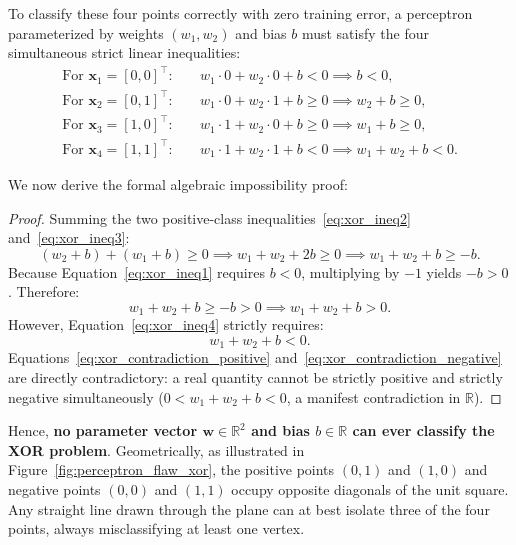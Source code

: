 To classify these four points correctly with zero training error, a perceptron parameterized by weights $(w_1, w_2)$ and bias $b$ must satisfy the four simultaneous strict linear inequalities:
\begin{align}
\text{For } \mathbf{x}_1 = [0, 0]^\top: \quad & w_1 \cdot 0 + w_2 \cdot 0 + b < 0 \implies b < 0, \label{eq:xor_ineq1} \\
\text{For } \mathbf{x}_2 = [0, 1]^\top: \quad & w_1 \cdot 0 + w_2 \cdot 1 + b \ge 0 \implies w_2 + b \ge 0, \label{eq:xor_ineq2} \\
\text{For } \mathbf{x}_3 = [1, 0]^\top: \quad & w_1 \cdot 1 + w_2 \cdot 0 + b \ge 0 \implies w_1 + b \ge 0, \label{eq:xor_ineq3} \\
\text{For } \mathbf{x}_4 = [1, 1]^\top: \quad & w_1 \cdot 1 + w_2 \cdot 1 + b < 0 \implies w_1 + w_2 + b < 0. \label{eq:xor_ineq4}
\end{align}

We now derive the formal algebraic impossibility proof:
\begin{proof}
Summing the two positive-class inequalities~\eqref{eq:xor_ineq2} and~\eqref{eq:xor_ineq3}:
\begin{equation}
(w_2 + b) + (w_1 + b) \ge 0 \implies w_1 + w_2 + 2b \ge 0 \implies w_1 + w_2 + b \ge -b.
\end{equation}
Because Equation~\eqref{eq:xor_ineq1} requires $b < 0$, multiplying by $-1$ yields $-b > 0$. Therefore:
\begin{equation}
w_1 + w_2 + b \ge -b > 0 \implies w_1 + w_2 + b > 0.
\label{eq:xor_contradiction_positive}
\end{equation}
However, Equation~\eqref{eq:xor_ineq4} strictly requires:
\begin{equation}
w_1 + w_2 + b < 0.
\label{eq:xor_contradiction_negative}
\end{equation}
Equations~\eqref{eq:xor_contradiction_positive} and~\eqref{eq:xor_contradiction_negative} are directly contradictory: a real quantity cannot be strictly positive and strictly negative simultaneously ($0 < w_1 + w_2 + b < 0$, a manifest contradiction in $\mathbb{R}$). 
\end{proof}

Hence, \textbf{no parameter vector $\mathbf{w} \in \mathbb{R}^2$ and bias $b \in \mathbb{R}$ can ever classify the XOR problem}. Geometrically, as illustrated in Figure~\ref{fig:perceptron_flaw_xor}, the positive points $(0, 1)$ and $(1, 0)$ and negative points $(0, 0)$ and $(1, 1)$ occupy opposite diagonals of the unit square. Any straight line drawn through the plane can at best isolate three of the four points, always misclassifying at least one vertex.

